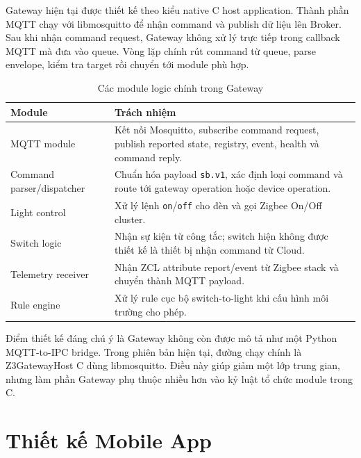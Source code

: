 Gateway hiện tại được thiết kế theo kiểu native C host application. Thành phần MQTT chạy với libmosquitto để nhận command và publish dữ liệu lên Broker. Sau khi nhận command request, Gateway không xử lý trực tiếp trong callback MQTT mà đưa vào queue. Vòng lặp chính rút command từ queue, parse envelope, kiểm tra target rồi chuyển tới module phù hợp.

\begin{table}[H]
    \centering
    \caption{Các module logic chính trong Gateway}
    \label{tab:ch3-gateway-modules}
    \footnotesize
    \setlength{\tabcolsep}{3pt}
    \begin{tabular}{|>{\raggedright\arraybackslash}p{4.0cm}|>{\raggedright\arraybackslash}p{9.6cm}|}
        \hline
        \textbf{Module} & \textbf{Trách nhiệm} \\
        \hline
        MQTT module & Kết nối Mosquitto, subscribe command request, publish reported state, registry, event, health và command reply. \\
        \hline
        Command parser/dispatcher & Chuẩn hóa payload \texttt{sb.v1}, xác định loại command và route tới gateway operation hoặc device operation. \\
        \hline
        Light control & Xử lý lệnh \texttt{on}/\texttt{off} cho đèn và gọi Zigbee On/Off cluster. \\
        \hline
        Switch logic & Nhận sự kiện từ công tắc; switch hiện không được thiết kế là thiết bị nhận command từ Cloud. \\
        \hline
        Telemetry receiver & Nhận ZCL attribute report/event từ Zigbee stack và chuyển thành MQTT payload. \\
        \hline
        Rule engine & Xử lý rule cục bộ switch-to-light khi cấu hình môi trường cho phép. \\
        \hline
    \end{tabular}
    \setlength{\tabcolsep}{6pt}
\end{table}

Điểm thiết kế đáng chú ý là Gateway không còn được mô tả như một Python MQTT-to-IPC bridge. Trong phiên bản hiện tại, đường chạy chính là Z3GatewayHost C dùng libmosquitto. Điều này giúp giảm một lớp trung gian, nhưng làm phần Gateway phụ thuộc nhiều hơn vào kỷ luật tổ chức module trong C.

\section{Thiết kế Mobile App}
\label{sec:ch3-mobile-design}

